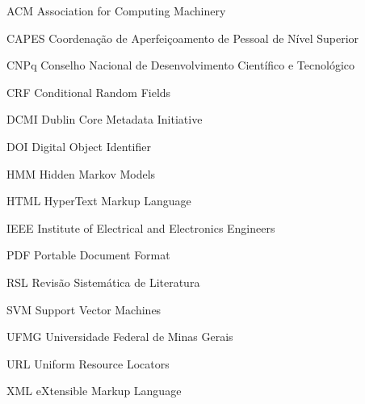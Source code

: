 
\begin{siglas}
  \item[ACM] Association for Computing Machinery
  \item[CAPES] Coordenação de Aperfeiçoamento de Pessoal de Nível Superior
  \item[CNPq] Conselho Nacional de Desenvolvimento Científico e Tecnológico
  \item[CRF] Conditional Random Fields
  \item[DCMI] Dublin Core Metadata Initiative
  \item[DOI] Digital Object Identifier
  \item[HMM] Hidden Markov Models
  \item[HTML] HyperText Markup Language
  \item[IEEE] Institute of Electrical and Electronics Engineers
  \item[PDF] Portable Document Format
  \item[RSL] Revisão Sistemática de Literatura
  \item[SVM] Support Vector Machines
  \item[UFMG] Universidade Federal de Minas Gerais
  \item[URL] Uniform Resource Locators
  \item[XML] eXtensible Markup Language
\end{siglas}
